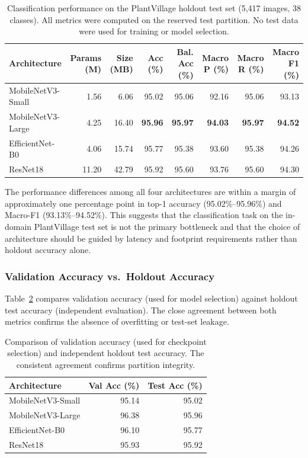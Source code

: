 \documentclass[pdflatex,sn-mathphys-num]{sn-jnl}
\begin{document}
\begin{table}[H]
\caption{Classification performance on the PlantVillage holdout test set (5{,}417
images, 38 classes). All metrics were computed on the reserved test partition.
No test data were used for training or model selection.}
\label{tab:pv_results}
\centering
\small
\begin{tabular}{lrrrrrrr}
\toprule
\textbf{Architecture} & \textbf{Params (M)} & \textbf{Size (MB)} &
\textbf{Acc (\%)} & \textbf{Bal. Acc (\%)} & \textbf{Macro P (\%)} &
\textbf{Macro R (\%)} & \textbf{Macro F1 (\%)} \\
\midrule
MobileNetV3-Small  & 1.56 &  6.06 & 95.02 & 95.06 & 92.16 & 95.06 & 93.13 \\
MobileNetV3-Large  & 4.25 & 16.40 & \textbf{95.96} & \textbf{95.97} & \textbf{94.03} & \textbf{95.97} & \textbf{94.52} \\
EfficientNet-B0    & 4.06 & 15.74 & 95.77 & 95.38 & 93.60 & 95.38 & 94.26 \\
ResNet18           & 11.20 & 42.79 & 95.92 & 95.60 & 93.76 & 95.60 & 94.30 \\
\bottomrule
\end{tabular}
\end{table}

The performance differences among all four architectures are within a margin of
approximately one percentage point in top-1 accuracy (95.02\%--95.96\%) and Macro-F1
(93.13\%--94.52\%). This suggests that the classification task on the in-domain
PlantVillage test set is not the primary bottleneck and that the choice of architecture
should be guided by latency and footprint requirements rather than holdout accuracy alone.

\subsubsection{Validation Accuracy vs.\ Holdout Accuracy}

Table~\ref{tab:val_vs_holdout} compares validation accuracy (used for model selection)
against holdout test accuracy (independent evaluation). The close agreement between
both metrics confirms the absence of overfitting or test-set leakage.

\begin{table}[H]
\caption{Comparison of validation accuracy (used for checkpoint selection) and
independent holdout test accuracy. The consistent agreement confirms
partition integrity.}
\label{tab:val_vs_holdout}
\centering
\begin{tabular}{lrr}
\toprule
\textbf{Architecture} & \textbf{Val Acc (\%)} & \textbf{Test Acc (\%)} \\
\midrule
MobileNetV3-Small  & 95.14 & 95.02 \\
MobileNetV3-Large  & 96.38 & 95.96 \\
EfficientNet-B0    & 96.10 & 95.77 \\
ResNet18           & 95.93 & 95.92 \\
\bottomrule
\end{tabular}
\end{table}
\end{document}
